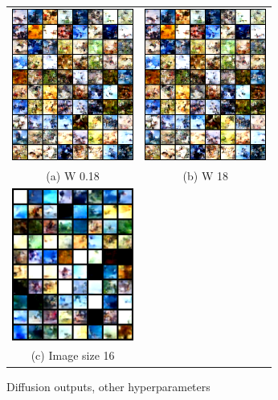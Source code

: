 \documentclass[conference]{IEEEtran}
\begin{document}
\begin{figure}
  \begin{tabular}{cc}
    \includegraphics[width=40mm]{./images/output/w018.png} 
&   \includegraphics[width=40mm]{./images/output/w18.png} 
\\
  (a) W 0.18
  & (b) W 18 \\[6pt]
      \includegraphics[width=40mm]{./images/output/size16.png} 
  &   
\\
  (c) Image size 16 & 
  \end{tabular}
  \caption{Diffusion outputs, other hyperparameters}
\end{figure}
%
%
\end{document}
